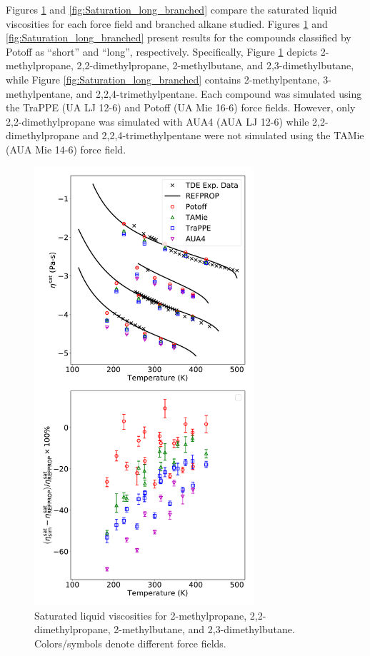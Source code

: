 \documentclass[preprint,review,12pt]{elsarticle}
\begin{document}
	Figures \ref{fig:Saturation_short_branched} and \ref{fig:Saturation_long_branched} compare the saturated liquid viscosities for each force field and branched alkane studied. Figures \ref{fig:Saturation_short_branched} and \ref{fig:Saturation_long_branched} present results for the compounds classified by Potoff as ``short'' and ``long'', respectively. Specifically, Figure \ref{fig:Saturation_short_branched} depicts 2-methylpropane, 2,2-dimethylpropane, 2-methylbutane, and 2,3-dimethylbutane, while Figure \ref{fig:Saturation_long_branched} contains 2-methylpentane, 3-methylpentane, and 2,2,4-trimethylpentane. Each compound was simulated using the TraPPE (UA LJ 12-6) and Potoff (UA Mie 16-6) force fields. However, only 2,2-dimethylpropane was simulated with AUA4 (AUA LJ 12-6) while 2,2-dimethylpropane and 2,2,4-trimethylpentane were not simulated using the TAMie (AUA Mie 14-6) force field.
	
	
	\begin{figure}[htb!]
		\centering
		\includegraphics[width=3.2in]{compare_force_fields_short_branched.pdf}
		\caption{Saturated liquid viscosities for 2-methylpropane, 2,2-dimethylpropane, 2-methylbutane, and 2,3-dimethylbutane. Colors/symbols denote different force fields.}
		\label{fig:Saturation_short_branched}
	\end{figure} 
	
\end{document}
